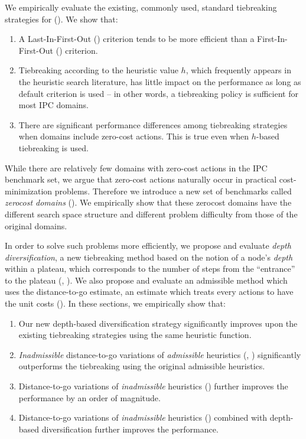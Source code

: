 We empirically evaluate the existing, commonly used, standard
tiebreaking strategies for \astar ().
We show that:

\begin{enumerate}
 \item A Last-In-First-Out (\lifo) criterion tends to be more efficient
       than a First-In-First-Out (\fifo) criterion.
 \item Tiebreaking according to the heuristic value $h$, which
       frequently appears in the heuristic search literature, has little
       impact on the performance as long as \lifo default criterion is used 
       --  in other words, a \lifo tiebreaking policy is sufficient for most IPC domains.
 \item There are significant performance differences among tiebreaking strategies
       when domains include zero-cost actions. This is true even when $h$-based tiebreaking is used.
\end{enumerate}

While there are relatively few domains with zero-cost actions in the IPC
benchmark set, we argue that zero-cost actions naturally occur in
practical cost-minimization problems. Therefore we introduce a new set of
benchmarks called \emph{zerocost domains}
().  We empirically show that these
zerocost domains have the different search space structure and different
problem difficulty from those of the original domains.

In order to solve such problems more efficiently, we propose and
evaluate \emph{depth diversification}, a new
tiebreaking method based on the notion of a node's \emph{depth} within a plateau,
which corresponds to the number of steps from the ``entrance'' to
the plateau (,
). We also propose and evaluate an
admissible method which uses the distance-to-go estimate, an estimate which treats every actions
to have the unit costs ().
In these sections, we empirically show that:
\begin{enumerate}
 \item Our new depth-based diversification strategy significantly improves upon the 
       existing tiebreaking strategies using the same heuristic function.
 \item \emph{Inadmissible} distance-to-go variations of \emph{admissible} heuristics
       (\lmcut, \mands)
       significantly outperforms the tiebreaking using the original admissible heuristics.
 \item Distance-to-go variations of \emph{inadmissible} heuristics
       (\ff) further improves the performance by an order of magnitude.
 \item Distance-to-go variations of \emph{inadmissible} heuristics
       (\ff) combined with depth-based diversification further
       improves the performance.
\end{enumerate}

